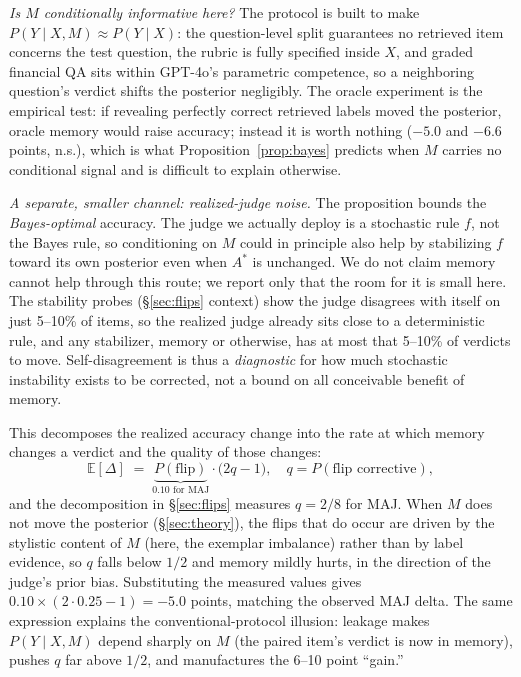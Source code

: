 \documentclass[11pt]{article}
\begin{document}
\emph{Is $M$ conditionally informative here?} The protocol is built to make $P(Y\mid X,M)\approx P(Y\mid X)$: the question-level split guarantees no retrieved item concerns the test question, the rubric is fully specified inside $X$, and graded financial QA sits within GPT-4o's parametric competence, so a neighboring question's verdict shifts the posterior negligibly. The oracle experiment is the empirical test: if revealing perfectly correct retrieved labels moved the posterior, oracle memory would raise accuracy; instead it is worth nothing ($-5.0$ and $-6.6$ points, n.s.), which is what Proposition~\ref{prop:bayes} predicts when $M$ carries no conditional signal and is difficult to explain otherwise.

\emph{A separate, smaller channel: realized-judge noise.} The proposition bounds the \emph{Bayes-optimal} accuracy. The judge we actually deploy is a stochastic rule $f$, not the Bayes rule, so conditioning on $M$ could in principle also help by stabilizing $f$ toward its own posterior even when $A^*$ is unchanged. We do not claim memory cannot help through this route; we report only that the room for it is small here. The stability probes (\S\ref{sec:flips} context) show the judge disagrees with itself on just 5--10\% of items, so the realized judge already sits close to a deterministic rule, and any stabilizer, memory or otherwise, has at most that 5--10\% of verdicts to move. Self-disagreement is thus a \emph{diagnostic} for how much stochastic instability exists to be corrected, not a bound on all conceivable benefit of memory.

This decomposes the realized accuracy change into the rate at which memory changes a verdict and the quality of those changes:
\[
\mathbb{E}[\Delta] \;=\; \underbrace{P(\text{flip})}_{0.10 \text{ for MAJ}} \cdot \bigl(2q - 1\bigr), \quad q = P(\text{flip corrective}),
\]
and the decomposition in \S\ref{sec:flips} measures $q = 2/8$ for MAJ. When $M$ does not move the posterior (\S\ref{sec:theory}), the flips that do occur are driven by the stylistic content of $M$ (here, the exemplar imbalance) rather than by label evidence, so $q$ falls below $1/2$ and memory mildly hurts, in the direction of the judge's prior bias. Substituting the measured values gives $0.10 \times (2 \cdot 0.25 - 1) = -5.0$ points, matching the observed MAJ delta. The same expression explains the conventional-protocol illusion: leakage makes $P(Y\mid X,M)$ depend sharply on $M$ (the paired item's verdict is now in memory), pushes $q$ far above $1/2$, and manufactures the 6--10 point ``gain.''
\end{document}
